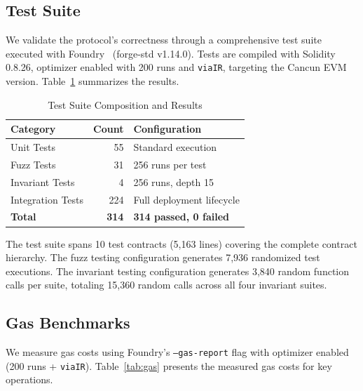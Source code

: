 \documentclass[conference]{IEEEtran}
\begin{document}
\subsection{Test Suite}

We validate the protocol's correctness through a comprehensive test suite executed with Foundry~\cite{foundry} (forge-std v1.14.0). Tests are compiled with Solidity 0.8.26, optimizer enabled with 200 runs and \texttt{viaIR}, targeting the Cancun EVM version. Table~\ref{tab:tests} summarizes the results.

\begin{table}[t]
\caption{Test Suite Composition and Results}
\label{tab:tests}
\centering
\begin{tabular}{lrl}
\toprule
\textbf{Category} & \textbf{Count} & \textbf{Configuration} \\
\midrule
Unit Tests & 55 & Standard execution \\
Fuzz Tests & 31 & 256 runs per test \\
Invariant Tests & 4 & 256 runs, depth 15 \\
Integration Tests & 224 & Full deployment lifecycle \\
\midrule
\textbf{Total} & \textbf{314} & \textbf{314 passed, 0 failed} \\
\bottomrule
\end{tabular}
\end{table}

The test suite spans 10 test contracts (5,163 lines) covering the complete contract hierarchy. The fuzz testing configuration generates 7,936 randomized test executions. The invariant testing configuration generates 3,840 random function calls per suite, totaling 15,360 random calls across all four invariant suites.

\subsection{Gas Benchmarks}

We measure gas costs using Foundry's \texttt{--gas-report} flag with optimizer enabled (200 runs + \texttt{viaIR}). Table~\ref{tab:gas} presents the measured gas costs for key operations.
\end{document}
